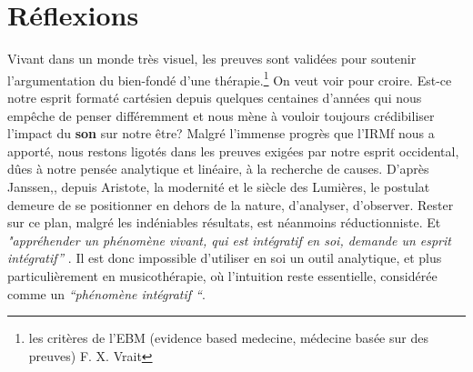 \chapter{Réflexions}
Vivant dans un monde très visuel, les preuves sont
validées pour soutenir l'argumentation du bien-fondé d'une thérapie.\autocite[ch. II, pp. 105--106 ]{vrait_musicotherapie_2018}\footnote{
	les critères de l'EBM (evidence based medecine, médecine basée sur des 
        preuves) F. X. Vrait }
      On veut voir pour croire.
Est-ce notre esprit formaté cartésien depuis quelques centaines d'années qui nous 
empêche de penser différemment 
et nous mène à vouloir toujours crédibiliser l'impact 
du \textbf{son} sur notre être?
Malgré l'immense progrès que l'IRMf nous a apporté, nous restons
  ligotés dans les preuves exigées par notre esprit occidental, dûes à
  notre pensée analytique et linéaire, à la recherche de
  causes.
D'après Janssen,\autocite[201]{van_eersel_cerveau}, depuis Aristote, la modernité et le
siècle des Lumières, le postulat demeure de se positionner en dehors
de la nature, d'analyser, d'observer. Rester sur ce plan, malgré les
indéniables résultats, est néanmoins
réductionniste. Et 
\textit{"appréhender un phénomène vivant, qui est intégratif en soi, demande un esprit
  intégratif''} \autocite[201]{van_eersel_cerveau}.
Il est donc impossible d'utiliser en soi un outil analytique, et
plus 
particulièrement en musicothérapie, où l'intuition reste essentielle, 
considérée comme un \textit{``phénomène intégratif ``}.  



